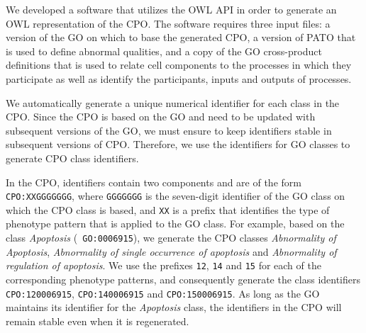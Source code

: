 \documentclass{bioinfo}
\renewcommand{\cite}{\citep}
\begin{document}
We developed a software that utilizes the OWL API \cite{Horridge2007}
in order to generate an OWL representation of the CPO. The software
requires three input files: a version of the GO on which to base the
generated CPO, a version of PATO that is used to define abnormal
qualities, and a copy of the GO cross-product definitions
\cite{Mungall2010go} that is used to relate cell components to the
processes in which they participate as well as identify the
participants, inputs and outputs of processes.

We automatically generate a unique numerical identifier for each class
in the CPO.  Since the CPO is based on the GO and need to be updated
with subsequent versions of the GO, we must ensure to keep identifiers
stable in subsequent versions of CPO. Therefore, we use the
identifiers for GO classes to generate CPO class identifiers.

In the CPO, identifiers contain two components and are of the form
{\tt CPO:XXGGGGGGG}, where {\tt GGGGGGG} is the seven-digit identifier
of the GO class on which the CPO class is based, and {\tt XX} is a
prefix that identifies the type of phenotype pattern that is applied
to the GO class. For example, based on the class {\em Apoptosis} ({\tt
  GO:0006915}), we generate the CPO classes {\em Abnormality of
  Apoptosis}, {\em Abnormality of single occurrence of apoptosis} and
{\em Abnormality of regulation of apoptosis}.  We use the prefixes
{\tt 12}, {\tt 14} and {\tt 15} for each of the corresponding
phenotype patterns, and consequently generate the class identifiers
{\tt CPO:120006915}, {\tt CPO:140006915} and {\tt CPO:150006915}. As
long as the GO maintains its identifier for the {\em Apoptosis} class,
the identifiers in the CPO will remain stable even when it is
regenerated.
\end{document}
